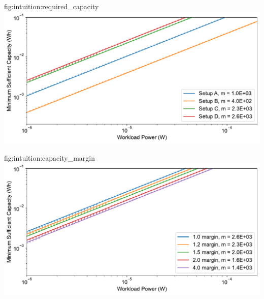 \begin{definefigure}{fig:intuition:required_capacity}
    \centering
    \includegraphics[width=\columnwidth]{figs/chap3/required_capacity.pdf}
    \caption{
    The minimum sufficient capacity to support a workload given an income. Note the x- and y-axis log scale. The average workload and income power are set equal; however the variability of income power is determined by the synthetic EnHANTs traces. The minimum sufficient capacity follows a linear trend with increasing income and workload power. Even though each line appears parallel, lines that are higher up on the y-axis actually have a larger slope due to the log scale.
    }
\end{definefigure}

\begin{definefigure}{fig:intuition:capacity_margin}
    \centering
    \includegraphics[width=\columnwidth]{figs/chap3/capacity_margin.pdf}
    \caption{
    The impact of workload margin on the minimum sufficient capacity. Traces synthesized from Setup D are considered, and are scaled by an income power. Six different workload margins are considered. The zero margin corresponds to the workload power being equal to the average income power. The $0.2$ margin represents the workload power requiring 80\% the power provided by the average income, for example. 
    As the margin increases, the ratio of the average workload power to the income power decreases. With a higher margin there is less energy that must be captured to satisfy the workload and the minimum sufficient capacity decreases.
    }
\end{definefigure}

